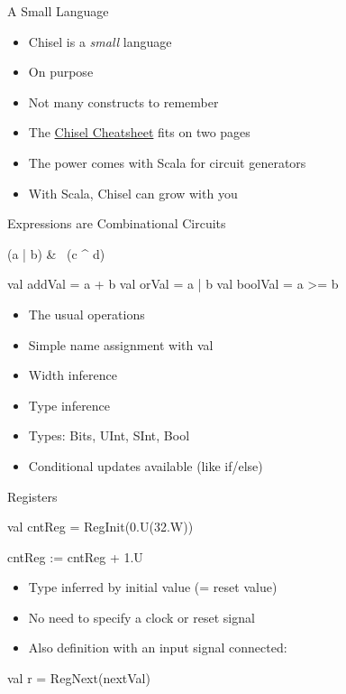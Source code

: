 \begin{frame}[fragile]{A Small Language}
\begin{itemize}
\item Chisel is a \emph{small} language
\item On purpose
\item Not many constructs to remember
\item The \href{https://github.com/freechipsproject/chisel-cheatsheet/releases/latest/download/chisel_cheatsheet.pdf}{Chisel Cheatsheet} fits on two pages
\item The power comes with Scala for circuit generators
\item With Scala, Chisel can grow with you
\end{itemize}
\end{frame}

\begin{frame}[fragile]{Expressions are Combinational Circuits}
\begin{chisel}
(a | b) & ~(c ^ d)

val addVal = a + b
val orVal = a | b
val boolVal = a >= b
\end{chisel}
\begin{itemize}
\item The usual operations 
\item Simple name assignment with val
\item Width inference
\item Type inference
\item Types: Bits, UInt, SInt, Bool
\item Conditional updates available (like if/else)
\end{itemize}
\end{frame}

\begin{frame}[fragile]{Registers}
\begin{chisel}
val cntReg = RegInit(0.U(32.W))

cntReg := cntReg + 1.U
\end{chisel}
\begin{itemize}
\item Type inferred by initial value (= reset value)
\item No need to specify a clock or reset signal
\end{itemize}
\begin{itemize}
\item Also definition with an input signal connected:
\end{itemize}
\begin{chisel}
val r = RegNext(nextVal) 
\end{chisel}
\end{frame}



